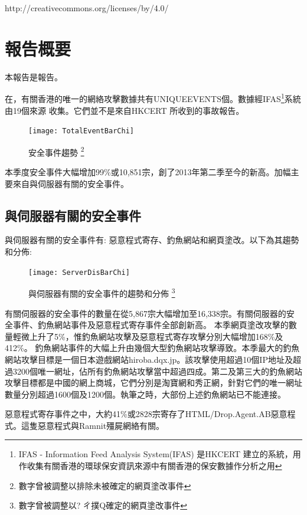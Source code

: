 \documentclass[14pt]{extarticle}
\begin{document}
http://creativecommons.org/licenses/by/4.0/

\clearpage
\tableofcontents
\clearpage

\section*{報告概要}
本報告是報告。

在，有關香港的唯一的網絡攻擊數據共有UNIQUEEVENTS個。數據經IFAS\footnote{IFAS - Information Feed Analysis System(IFAS) 是HKCERT 建立的系統，用作收集有關香港的環球保安資訊來源中有關香港的保安數據作分析之用}系統由19個來源 收集。它們並不是來自HKCERT 所收到的事故報告。

\begin{figure}[h!]
\centerline{\texttt{[image: TotalEventBarChi]}}
\caption{安全事件趨勢
{\protect\footnote{數字曾被調整以排除未被確定的網頁塗改事件}}}
\end{figure}

本季度安全事件大幅增加99\%或10,851宗，創了2013年第二季至今的新高。加幅主要來自與伺服器有關的安全事件。

\subsection*{與伺服器有關的安全事件}

與伺服器有關的安全事件有: 惡意程式寄存、釣魚網站和網頁塗改。以下為其趨勢和分佈:

\begin{figure}[h!]
\centerline{\texttt{[image: ServerDisBarChi]}}
\caption{與伺服器有關的安全事件的趨勢和分佈
{\protect\footnote{數字曾被調整以?ㄔ撲Q確定的網頁塗改事件}}}
\end{figure}
有關伺服器的安全事件的數量在從5,867宗大幅增加至16,338宗。有關伺服器的安全事件、釣魚網站事件及惡意程式寄存事件全部創新高。
本季網頁塗改攻擊的數量輕微上升了5\%，惟釣魚網站攻擊及惡意程式寄存攻擊分別大幅增加168\%及412\%。
釣魚網站事件的大幅上升由幾個大型釣魚網站攻擊導致。本季最大的釣魚網站攻擊目標是一個日本遊戲網站hiroba.dqx.jp。該攻擊使用超過10個IP地址及超過3200個唯一網址，佔所有釣魚網站攻擊當中超過四成。第二及第三大的釣魚網站攻擊目標都是中國的網上商城，它們分別是淘寶網和秀正網，針對它們的唯一網址數量分別超過1600個及1200個。執筆之時，大部份上述釣魚網站已不能連接。

惡意程式寄存事件之中，大約41\%或2828宗寄存了HTML/Drop.Agent.AB惡意程式。這隻惡意程式與Ramnit殭屍網絡有關。
\end{document}
